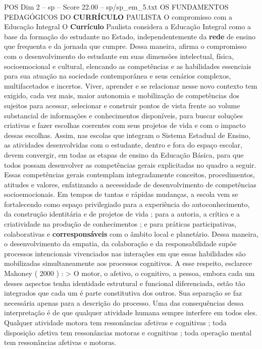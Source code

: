 \begin{textsample}{POS Dim 2 – sp – Score 22.00 – sp/sp\_em\_5.txt}  \label{ex:f2_pos_203}
OS FUNDAMENTOS PEDAGÓGICOS DO \textbf{CURRÍCULO} PAULISTA O compromisso com a Educação Integral O \textbf{Currículo} Paulista considera a Educação Integral como a base da formação do estudante no Estado, independentemente da \textbf{rede} de ensino que frequenta e da jornada que cumpre.
Dessa maneira, afirma o compromisso com o desenvolvimento do estudante em suas dimensões intelectual, física, socioemocional e cultural, elencando as competências e as habilidades essenciais para sua atuação na sociedade contemporânea e seus cenários complexos, multifacetados e incertos.
Viver, aprender e se relacionar nesse novo contexto tem exigido, cada vez mais, maior autonomia e mobilização de competências dos sujeitos para acessar, selecionar e construir pontos de vista frente ao volume substancial de informações e conhecimentos disponíveis, para buscar soluções criativas e fazer escolhas coerentes com seus projetos de vida e com o impacto dessas escolhas.
Assim, nas escolas que integram o Sistema Estadual de Ensino, as atividades desenvolvidas com o estudante, dentro e fora do espaço escolar, devem convergir, em todas as etapas de ensino da Educação Básica, para que todos possam desenvolver as competências gerais explicitadas no quadro a seguir.
Essas competências gerais contemplam integradamente conceitos, procedimentos, atitudes e valores, enfatizando a necessidade de desenvolvimento de competências socioemocionais.
Em tempos de tantas e rápidas mudanças, a escola vem se fortalecendo como espaço privilegiado para a experiência do autoconhecimento, da construção identitária e de projetos de vida ; para a autoria, a crítica e a criatividade na produção de conhecimentos ; e para práticas participativas, colaborativas e \textbf{corresponsáveis} com o âmbito local e planetário.
Dessa maneira, o desenvolvimento da empatia, da colaboração e da responsabilidade supõe processos intencionais vivenciados nas interações em que essas habilidades são mobilizadas simultaneamente aos processos cognitivos.
A esse respeito, esclarece Mahoney ( 2000 ) : > O motor, o afetivo, o cognitivo, a pessoa, embora cada um desses aspectos tenha identidade estrutural e funcional diferenciada, estão tão integrados que cada um é parte constitutiva dos outros.
Sua separação se faz necessária apenas para a descrição do processo.
Uma das consequências dessa interpretação é de que qualquer atividade humana sempre interfere em todos eles.
Qualquer atividade motora tem ressonâncias afetivas e cognitivas ; toda disposição afetiva tem ressonâncias motoras e cognitivas ; toda operação mental tem ressonâncias afetivas e motoras.

\end{textsample}
